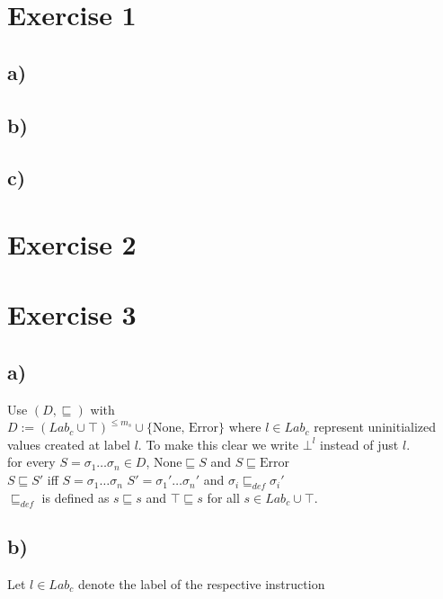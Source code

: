 \documentclass[fleqn,12pt]{article}
\begin{document}
\section*{Exercise 1}
\subsection*{a)}
\subsection*{b)}
\subsection*{c)}
\section*{Exercise 2}
\section*{Exercise 3}
\subsection*{a)}
Use $(D,\sqsubseteq)$ with\\
$D := (Lab_c \cup \top)^{\leq m_s} \cup \{\text{None, Error}\}$ where $l \in Lab_c$ represent uninitialized values created at label $l$. To make this clear we write $\bot^l$ instead of just $l$.\\

for every $S=\sigma_1\dots\sigma_n \in D$, $\text{None} \sqsubseteq S$ and $S \sqsubseteq \text{Error}$\\
$S \sqsubseteq S'$ iff $S=\sigma_1\dots\sigma_n$ $S'=\sigma_1'\dots\sigma_n'$ and $\sigma_i \sqsubseteq_{def} \sigma_i'$\\
$\sqsubseteq_{def}$ is defined as $s \sqsubseteq s$ and $\top \sqsubseteq s$ for all $s \in Lab_c \cup \top$.
\subsection*{b)}
Let $l \in Lab_c$ denote the label of the respective instruction\\
\end{document}
